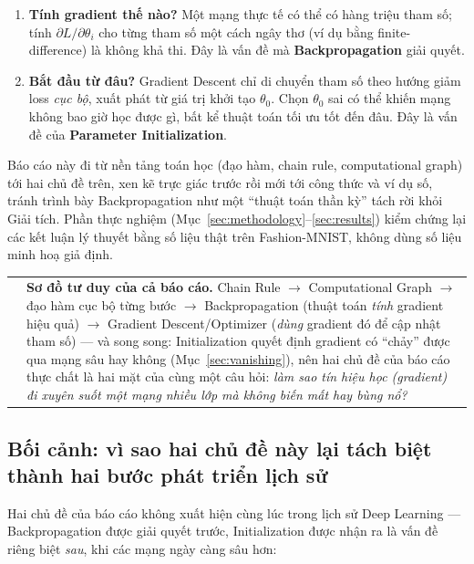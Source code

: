 \documentclass[12pt,a4paper]{article}
\makeatletter
\newenvironment{tructiep}[1][Cách hiểu đơn giản]
  {\par\smallskip\noindent\begin{tabular}{@{}p{0.35em}@{\hspace{6pt}}p{\dimexpr\linewidth-1.9em\relax}@{}}
   \textcolor{boxln}{\rule{2pt}{\baselineskip}} & \textbf{#1.}\enspace\ignorespaces}
  {\end{tabular}\par\smallskip}
\makeatother
\begin{document}
\begin{enumerate}
\item \textbf{Tính gradient thế nào?} Một mạng thực tế có thể có hàng triệu
  tham số; tính $\partial L/\partial\theta_i$ cho từng tham số một cách
  ngây thơ (ví dụ bằng finite-difference) là không khả thi. Đây là vấn đề
  mà \textbf{Backpropagation} giải quyết.
\item \textbf{Bắt đầu từ đâu?} Gradient Descent chỉ di chuyển tham số theo
  hướng giảm loss \emph{cục bộ}, xuất phát từ giá trị khởi tạo $\theta_0$.
  Chọn $\theta_0$ sai có thể khiến mạng không bao giờ học được gì, bất kể
  thuật toán tối ưu tốt đến đâu. Đây là vấn đề của
  \textbf{Parameter Initialization}.
\end{enumerate}

Báo cáo này đi từ nền tảng toán học (đạo hàm, chain rule, computational
graph) tới hai chủ đề trên, xen kẽ trực giác trước rồi mới tới công thức và
ví dụ số, tránh trình bày Backpropagation như một ``thuật toán thần kỳ''
tách rời khỏi Giải tích. Phần thực nghiệm (Mục~\ref{sec:methodology}--\ref{sec:results})
kiểm chứng lại các kết luận lý thuyết bằng số liệu thật trên Fashion-MNIST,
không dùng số liệu minh hoạ giả định.

\begin{tructiep}[Sơ đồ tư duy của cả báo cáo]
Chain Rule $\to$ Computational Graph $\to$ đạo hàm cục bộ từng bước $\to$
Backpropagation (thuật toán \emph{tính} gradient hiệu quả) $\to$ Gradient
Descent/Optimizer (\emph{dùng} gradient đó để cập nhật tham số) --- và song
song: Initialization quyết định gradient có ``chảy'' được qua mạng sâu hay
không (Mục~\ref{sec:vanishing}), nên hai chủ đề của báo cáo thực chất là
hai mặt của cùng một câu hỏi: \emph{làm sao tín hiệu học (gradient) đi
xuyên suốt một mạng nhiều lớp mà không biến mất hay bùng nổ?}
\end{tructiep}

\subsection*{Bối cảnh: vì sao hai chủ đề này lại tách biệt thành hai bước
phát triển lịch sử}

Hai chủ đề của báo cáo không xuất hiện cùng lúc trong lịch sử Deep
Learning --- Backpropagation được giải quyết trước, Initialization được
nhận ra là vấn đề riêng biệt \emph{sau}, khi các mạng ngày càng sâu hơn:
\end{document}
